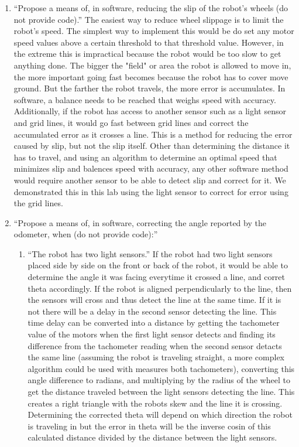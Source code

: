 \documentclass[twocolumn]{article}
\begin{document}
\begin{enumerate}
\item ``Propose a means of, in software, reducing the slip of the robot's wheels (do not provide code).\cite{lab2}'' The easiest way to reduce wheel slippage is to limit the robot's speed. The simplest way to implement this would be do set any motor speed values above a certain threshold to that threshold value. However, in the extreme this is impractical because the robot would be too slow to get anything done. The bigger the "field" or area the robot is allowed to move in, the more important going fast becomes because the robot has to cover move ground. But the farther the robot travels, the more error is accumulates. In software, a balance needs to be reached that weighs speed with accuracy. Additionally, if the robot has access to another sensor such as a light sensor and grid lines, it would go fast between grid lines and correct the accumulated error as it crosses a line. This is a method for reducing the error caused by slip, but not the slip itself. Other than determining the distance it has to travel, and using an algorithm to determine an optimal speed that minimizes slip and balences speed with accuracy, any other software method would require another sensor to be able to detect slip and correct for it. We demonstrated this in this lab using the light sensor to correct for error using the grid lines.
\item ``Propose a means of, in software, correcting the angle reported by the odometer, when (do not provide code):\cite{lab2}''
\begin{enumerate}
\item ``The robot has two light sensors.\cite{lab2}''
If the robot had two light sensors placed side by side on the front or back of the robot, it would be able to determine the angle it was facing everytime it crossed a line, and corret theta accordingly. If the robot is aligned perpendicularly to the line, then the sensors will cross and thus detect the line at the same time. If it is not there will be a delay in the second sensor detecting the line. This time delay can be converted into a distance by getting the tachometer value of the motors when the first light sensor detects and finding its difference from the tachometer reading when the second sensor detacts the same line (assuming the robot is traveling straight, a more complex algorithm could be used with measures both tachometers), converting this angle difference to radians, and multiplying by the radius of the wheel to get the distance traveled between the light sensors detecting the line. This creates a right triangle with the robots skew and the line it is crossing. Determining the corrected theta will depend on which direction the robot is traveling in but the error in theta will be the inverse cosin of this calculated distance divided by the distance between the light sensors.

\end{enumerate}
\end{enumerate}
\end{document}
